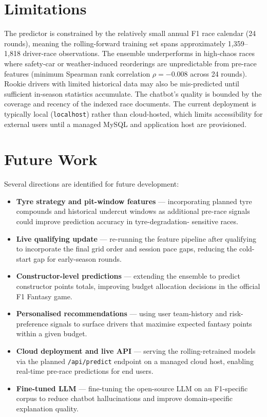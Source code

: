 \documentclass[12pt, a4paper, oneside]{report}
\begin{document}
\section{Limitations}

The predictor is constrained by the relatively small annual F1 race calendar
(24 rounds), meaning the rolling-forward training set spans approximately
1{,}359--1{,}818 driver-race observations. The ensemble underperforms in
high-chaos races where safety-car or weather-induced reorderings are
unpredictable from pre-race features (minimum Spearman rank correlation $\rho = -0.008$
across 24 rounds). Rookie drivers with limited historical data may also be
mis-predicted until sufficient in-season statistics accumulate. The chatbot's
quality is bounded by the coverage and recency of the indexed race documents.
The current deployment is typically local (\texttt{localhost}) rather than
cloud-hosted, which limits accessibility for external users until a managed
MySQL and application host are provisioned.

\section{Future Work}

Several directions are identified for future development:

\begin{itemize}[leftmargin=*]
  \item \textbf{Tyre strategy and pit-window features} --- incorporating
        planned tyre compounds and historical undercut windows as additional
        pre-race signals could improve prediction accuracy in tyre-degradation-
        sensitive races.
  \item \textbf{Live qualifying update} --- re-running the feature pipeline
        after qualifying to incorporate the final grid order and session pace
        gaps, reducing the cold-start gap for early-season rounds.
  \item \textbf{Constructor-level predictions} --- extending the ensemble to
        predict constructor points totals, improving budget allocation decisions
        in the official F1 Fantasy game.
  \item \textbf{Personalised recommendations} --- using user team-history and
        risk-preference signals to surface drivers that maximise expected fantasy
        points within a given budget.
  \item \textbf{Cloud deployment and live API} --- serving the rolling-retrained
        models via the planned \texttt{/api/predict} endpoint on a managed
        cloud host, enabling real-time pre-race predictions for end users.
  \item \textbf{Fine-tuned LLM} --- fine-tuning the open-source LLM on an
        F1-specific corpus to reduce chatbot hallucinations and improve
        domain-specific explanation quality.
\end{itemize}

\newpage
\end{document}
